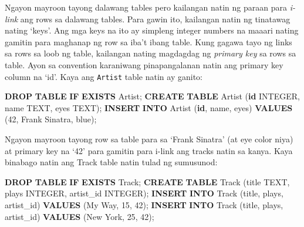 \documentclass[10pt,]{book}
\newenvironment{Shaded}{}{}
\newcommand{\ControlFlowTok}[1]{\textcolor[rgb]{0.00,0.44,0.13}{\textbf{#1}}}
\newcommand{\DataTypeTok}[1]{\textcolor[rgb]{0.56,0.13,0.00}{#1}}
\newcommand{\DecValTok}[1]{\textcolor[rgb]{0.25,0.63,0.44}{#1}}
\newcommand{\KeywordTok}[1]{\textcolor[rgb]{0.00,0.44,0.13}{\textbf{#1}}}
\newcommand{\NormalTok}[1]{#1}
\newcommand{\StringTok}[1]{\textcolor[rgb]{0.25,0.44,0.63}{#1}}
\begin{document}
 Ngayon mayroon tayong dalawang tables pero kailangan
natin ng paraan para \emph{i-link} ang rows sa dalawang tables. Para
gawin ito, kailangan natin ng tinatawag nating `keys'. Ang mga keys na
ito ay simpleng integer numbers na maaari nating gamitin para maghanap
ng row sa iba't ibang table. Kung gagawa tayo ng links sa rows sa loob
ng table, kailangan nating magdagdag ng \emph{primary key} sa rows sa
table. Ayon sa convention karaniwang pinapangalanan natin ang primary
key column na `id'. Kaya ang \texttt{Artist} table natin ay ganito:

\begin{Shaded}
\begin{Highlighting}[]
\KeywordTok{DROP} \KeywordTok{TABLE} \ControlFlowTok{IF} \KeywordTok{EXISTS}\NormalTok{ Artist;}
\KeywordTok{CREATE} \KeywordTok{TABLE}\NormalTok{ Artist (}\KeywordTok{id} \DataTypeTok{INTEGER}\NormalTok{, name TEXT, eyes TEXT);}
\KeywordTok{INSERT} \KeywordTok{INTO}\NormalTok{ Artist (}\KeywordTok{id}\NormalTok{, name, eyes)}
   \KeywordTok{VALUES}\NormalTok{ (}\DecValTok{42}\NormalTok{, }\StringTok{\textquotesingle{}Frank Sinatra\textquotesingle{}}\NormalTok{, }\StringTok{\textquotesingle{}blue\textquotesingle{}}\NormalTok{);}
\end{Highlighting}
\end{Shaded}

Ngayon mayroon tayong row sa table para sa `Frank Sinatra' (at eye color
niya) at primary key na `42' para gamitin para i-link ang tracks natin
sa kanya. Kaya binabago natin ang Track table natin tulad ng sumusunod:

\begin{Shaded}
\begin{Highlighting}[]
\KeywordTok{DROP} \KeywordTok{TABLE} \ControlFlowTok{IF} \KeywordTok{EXISTS}\NormalTok{ Track;}
\KeywordTok{CREATE} \KeywordTok{TABLE}\NormalTok{ Track (title TEXT, plays }\DataTypeTok{INTEGER}\NormalTok{,}
\NormalTok{    artist\_id }\DataTypeTok{INTEGER}\NormalTok{);}
\KeywordTok{INSERT} \KeywordTok{INTO}\NormalTok{ Track (title, plays, artist\_id)}
    \KeywordTok{VALUES}\NormalTok{ (}\StringTok{\textquotesingle{}My Way\textquotesingle{}}\NormalTok{, }\DecValTok{15}\NormalTok{, }\DecValTok{42}\NormalTok{);}
\KeywordTok{INSERT} \KeywordTok{INTO}\NormalTok{ Track (title, plays, artist\_id)}
    \KeywordTok{VALUES}\NormalTok{ (}\StringTok{\textquotesingle{}New York\textquotesingle{}}\NormalTok{, }\DecValTok{25}\NormalTok{, }\DecValTok{42}\NormalTok{);}
\end{Highlighting}
\end{Shaded}
\end{document}
